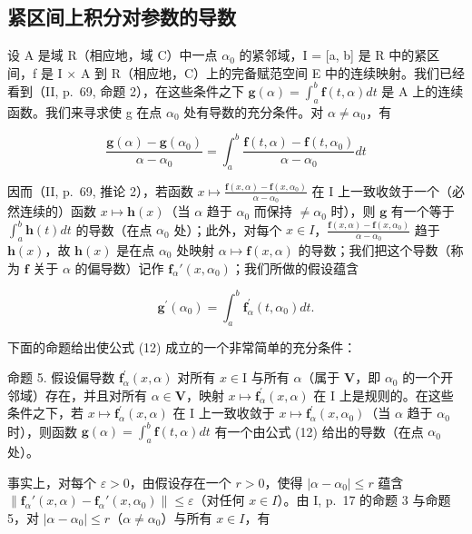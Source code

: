 \subsection{紧区间上积分对参数的导数}

设 A 是域 R（相应地，域 C）中一点 \(\alpha_{0}\) 的紧邻域，I = {[}a, b{]} 是 R 中的紧区间，f 是 I × A 到 R（相应地，C）上的完备赋范空间 E 中的连续映射。我们已经看到（II, p.~69, 命题 2），在这些条件之下 \(\mathbf{g}(\alpha) = \int_{a}^{b} \mathbf{f}(t, \alpha) dt\) 是 A 上的连续函数。我们来寻求使 g 在点 \(\alpha_{0}\) 处有导数的充分条件。对 \(\alpha \neq \alpha_{0}\)，有

\[
\frac {\mathbf {g} (\alpha) - \mathbf {g} (\alpha_ {0})}{\alpha - \alpha_ {0}} = \int_ {a} ^ {b} \frac {\mathbf {f} (t , \alpha) - \mathbf {f} (t , \alpha_ {0})}{\alpha - \alpha_ {0}} d t
\]

因而（II, p.~69, 推论 2），若函数 \(x \mapsto \frac{\mathbf{f}(x, \alpha) - \mathbf{f}(x, \alpha_0)}{\alpha - \alpha_0}\) 在 I 上一致收敛于一个（必然连续的）函数 \(x \mapsto \mathbf{h}(x)\)（当 \(\alpha\) 趋于 \(\alpha_0\) 而保持 \(\neq \alpha_0\) 时），则 \(\mathbf{g}\) 有一个等于 \(\int_{a}^{b} \mathbf{h}(t) dt\) 的导数（在点 \(\alpha_0\) 处）；此外，对每个 \(x \in I\)，\(\frac{\mathbf{f}(x, \alpha) - \mathbf{f}(x, \alpha_0)}{\alpha - \alpha_0}\) 趋于 \(\mathbf{h}(x)\)，故 \(\mathbf{h}(x)\) 是在点 \(\alpha_0\) 处映射 \(\alpha \mapsto \mathbf{f}(x, \alpha)\) 的导数；我们把这个导数（称为 \(\mathbf{f}\) 关于 \(\alpha\) 的偏导数）记作 \(\mathbf{f}_{\alpha}'(x, \alpha_0)\)；我们所做的假设蕴含

\[
\mathbf {g} ^ {\prime} (\alpha_ {0}) = \int_ {a} ^ {b} \mathbf {f} _ {\alpha} ^ {\prime} (t, \alpha_ {0}) d t.\tag{12}
\]

下面的命题给出使公式 (12) 成立的一个非常简单的充分条件：

命题 5. 假设偏导数 \(\mathbf{f}_{\alpha}^{\prime}(x,\alpha)\) 对所有 \(x\in \mathrm{I}\) 与所有 \(\alpha\)（属于 \(\mathbf{V}\)，即 \(\alpha_0\) 的一个开邻域）存在，并且对所有 \(\alpha \in \mathbf{V}\)，映射 \(x\mapsto \mathbf{f}_{\alpha}^{\prime}(x,\alpha)\) 在 \(\mathrm{I}\) 上是规则的。在这些条件之下，若 \(x\mapsto \mathbf{f}_{\alpha}^{\prime}(x,\alpha)\) 在 \(\mathrm{I}\) 上一致收敛于 \(x\mapsto \mathbf{f}_{\alpha}^{\prime}(x,\alpha_0)\)（当 \(\alpha\) 趋于 \(\alpha_0\) 时），则函数 \(\mathbf{g}(\alpha) = \int_{a}^{b}\mathbf{f}(t,\alpha)dt\) 有一个由公式 (12) 给出的导数（在点 \(\alpha_0\) 处）。

事实上，对每个 \(\varepsilon > 0\)，由假设存在一个 \(r > 0\)，使得 \(|\alpha - \alpha_0| \leqslant r\) 蕴含 \(\left\| \mathbf{f}_{\alpha}'(x, \alpha) - \mathbf{f}_{\alpha}'(x, \alpha_0) \right\| \leqslant \varepsilon\)（对任何 \(x \in I\)）。由 I, p.~17 的命题 3 与命题 5，对 \(|\alpha - \alpha_0| \leqslant r\)（\(\alpha \neq \alpha_0\)）与所有 \(x \in I\)，有

